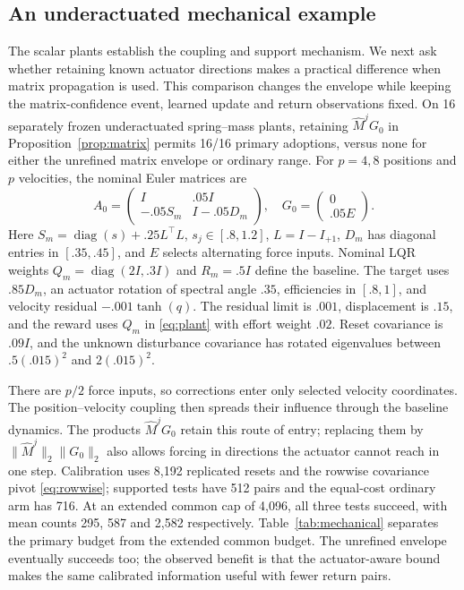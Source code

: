 \documentclass[twocolumn,nameyear]{autart}
\begin{document}
\subsection{An underactuated mechanical example}
The scalar plants establish the coupling and support mechanism. We next
ask whether retaining known actuator directions makes a practical
difference when matrix propagation is used. This comparison changes the
envelope while keeping the matrix-confidence event, learned update and
return observations fixed.
On 16 separately frozen underactuated spring--mass plants, retaining
$\widehat M^jG_0$ in Proposition~\ref{prop:matrix} permits 16/16 primary
adoptions, versus none for either the unrefined matrix envelope or ordinary
range. For $p=4,8$ positions and $p$ velocities, the nominal Euler matrices are
\[
 A_0=\begin{pmatrix}I&.05I\\-.05S_m&I-.05D_m\end{pmatrix},
 \quad G_0=\begin{pmatrix}0\\.05E\end{pmatrix}.
\]
Here $S_m=\operatorname{diag}(s)+.25L^\top L$, $s_j\in[.8,1.2]$,
$L=I-I_{+1}$, $D_m$ has diagonal entries in $[.35,.45]$, and $E$
selects alternating force inputs. Nominal LQR weights
$Q_m=\operatorname{diag}(2I,.3I)$ and $R_m=.5I$ define the baseline.
The target uses $.85D_m$, an actuator rotation of spectral angle $.35$,
efficiencies in $[.8,1]$, and velocity residual $-.001\tanh(q)$.
The residual limit is $.001$, displacement is $.15$, and the reward uses
$Q_m$ in \eqref{eq:plant} with effort weight $.02$. Reset covariance is
$.09I$, and the unknown disturbance covariance has rotated eigenvalues
between $.5(.015)^2$ and $2(.015)^2$.

There are $p/2$ force inputs, so corrections enter only selected
velocity coordinates. The position--velocity coupling then spreads
their influence through the baseline dynamics. The products
$\widehat M^jG_0$ retain this route of entry; replacing them by
$\|\widehat M^j\|_2\|G_0\|_2$ also allows forcing in directions the
actuator cannot reach in one step.
Calibration uses 8,192 replicated
resets and the rowwise covariance pivot \eqref{eq:rowwise}; supported
tests have 512 pairs and the equal-cost ordinary arm has 716.
At an extended common cap of 4,096, all three tests succeed, with mean
counts 295, 587 and 2,582 respectively. Table~\ref{tab:mechanical} separates the primary budget from the
extended common budget. The unrefined envelope eventually succeeds too;
the observed benefit is that the actuator-aware bound makes the same
calibrated information useful with fewer return pairs.
\end{document}
